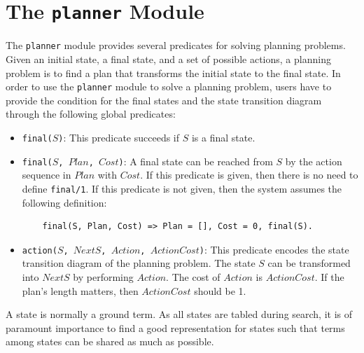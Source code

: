 \chapter{\label{chapter:planner}The \texttt{planner} Module}
The \texttt{planner} module provides several predicates for solving planning problems. Given an initial state, a final state, and a set of possible actions, a planning problem is to find a plan that transforms the initial state to the final state. In order to use the \texttt{planner} module to solve a planning problem, users have to provide the condition for the final states and the state transition diagram through the following global predicates:
\begin{itemize}
\item \texttt{final($S$)}: This predicate succeeds if $S$ is a final state.
\item \texttt{final($S$, $Plan$, $Cost$)}: A final state can be reached from $S$ by the action sequence in $Plan$ with $Cost$. If this predicate is given, then there is no need to define \texttt{final/1}. If this predicate is not given, then the system assumes the following definition:
\begin{verbatim}
    final(S, Plan, Cost) => Plan = [], Cost = 0, final(S).
\end{verbatim}

\item \texttt{action($S$, $NextS$, $Action$, $ActionCost$)}: This predicate encodes the state transition diagram of the planning problem. The state $S$ can be transformed into $NextS$ by performing $Action$. The cost of $Action$ is $ActionCost$. If the plan's length matters, then $ActionCost$ should be 1.
\end{itemize}

A state is normally a ground term. As all states are tabled during search, it is of paramount importance to find a good representation for states such that terms among states can be shared as much as possible.

